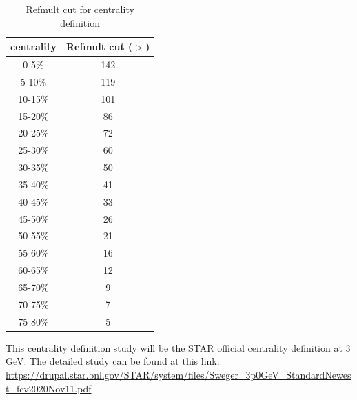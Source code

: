 \begin{table}[h]
    \centering
    \begin{tabular}{c|c}
    \hline
        centrality & Refmult cut ($>$) \\
        \hline
        0-5\%   &  142 \\ 
        5-10\%  & 119 \\
        10-15\% & 101 \\
        15-20\% & 86 \\
        20-25\% & 72 \\
        25-30\% & 60 \\
        30-35\% & 50 \\
        35-40\% & 41 \\ 
        40-45\% & 33 \\
        45-50\% & 26 \\
        50-55\% & 21 \\
        55-60\% & 16 \\
        60-65\% & 12 \\
        65-70\% & 9 \\
        70-75\% & 7 \\
        75-80\% & 5 \\
        \hline
    \end{tabular}
    \caption{Refmult cut for centrality definition}
    \label{tab:cent_def}
\end{table}

This centrality definition study will be the STAR official centrality definition at 3 GeV. The detailed study can be found at this link: \url{https://drupal.star.bnl.gov/STAR/system/files/Sweger_3p0GeV_StandardNewest_fcv2020Nov11.pdf}

